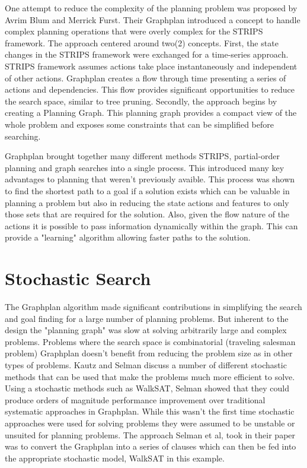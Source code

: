 \documentclass[paper=letter, fontsize=12pt]{article}
\begin{document}
One attempt to reduce the complexity of the planning problem was proposed by Avrim Blum and Merrick Furst\cite{Blum95fastplanning}. Their Graphplan introduced a concept to handle complex planning operations that were overly complex for the STRIPS framework. The approach centered around two(2) concepts.
First, the state changes in the STRIPS framework were exchanged for a time-series approach. STRIPS framework assumes actions take place instantaneously and independent of other actions\cite{fikesandnilsson1993}. Graphplan creates a flow through time presenting a series of actions and dependencies. This flow provides significant opportunities to reduce the search space, similar to tree pruning.\cite{Blum95fastplanning}
Secondly, the approach begins by creating a Planning Graph. This planning graph provides a compact view of the whole problem and exposes some constraints that can be simplified before searching\cite{Blum95fastplanning}.

Graphplan brought together many different methods STRIPS, partial-order planning and graph searches into a single process. This introduced many key advantages to planning that weren't previously avaible. This process was shown to find the shortest path to a goal if a solution exists\cite{Blum95fastplanning} which can be valuable in planning a problem but also in reducing the state actions and features to only those sets that are required for the solution. Also, given the flow nature of the actions it is possible to pass information dynamically within the graph. This can provide a "learning" algorithm allowing faster paths to the solution.

\section{Stochastic Search}

The Graphplan algorithm made significant contributions in simplifying the search and goal finding for a large number of planning problems. But inherent to the design the "planning graph" was slow at solving arbitrarily large and complex problems. Problems where the search space is combinatorial (traveling salesman problem) Graphplan doesn't benefit from reducing the problem size as in other types of problems. Kautz and Selman\cite{Kautz96stochastic} discuss a number of different stochastic methods that can be used that make the problems much more efficient to solve. Using a stochastic methods such as WalkSAT\cite{selman94walksat}, Selman showed that they could produce orders of magnitude performance improvement over traditional systematic approaches in Graphplan. While this wasn't the first time stochastic approaches were used for solving problems they were assumed to be unstable or unsuited for planning problems. The approach Selman et al, took in their paper\cite{Kautz96stochastic} was to convert the Graphplan into a series of clauses which can then be fed into the appropriate stochastic model, WalkSAT in this example.
\end{document}
